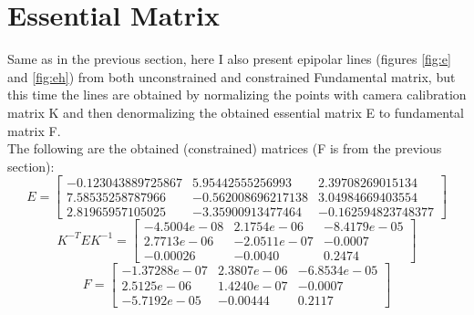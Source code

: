 \documentclass[paper=a4, fontsize=11pt]{scrartcl} %
\numberwithin{equation}{section} %
\numberwithin{figure}{section} %
\numberwithin{table}{section} %
\begin{document}
\section{Essential Matrix}
Same as in the previous section, here I also present epipolar lines (figures \ref{fig:e} and \ref{fig:eh}) from both unconstrained and constrained Fundamental matrix, but this time the lines are obtained by normalizing the points with camera calibration matrix K and then denormalizing the obtained essential matrix E to fundamental matrix F.\\
The following are the obtained (constrained) matrices (F is from the previous section):
\[ E=
\begin{bmatrix}
-0.123043889725867	& 5.95442555256993	& 2.39708269015134 \\
7.58535258787966 &	-0.562008696217138	& 3.04984669403554 \\
2.81965957105025 &	-3.35900913477464 &	-0.162594823748377
\end{bmatrix}
\]
\[ K^{-T}  E  K^{-1}=
\begin{bmatrix}
-4.5004e-08 & 	2.1754e-06 &	-8.4179e-05 \\
2.7713e-06 &	-2.0511e-07 &	-0.0007 \\
-0.00026	& -0.0040	& 0.2474
\end{bmatrix}
\]
\[ F=
\begin{bmatrix}
-1.37288e-07 &	2.3807e-06	& -6.8534e-05 \\
2.5125e-06	& 1.4240e-07 &	-0.0007 \\
-5.7192e-05	& -0.00444 &	0.2117
\end{bmatrix}
\]
 
\end{document}
